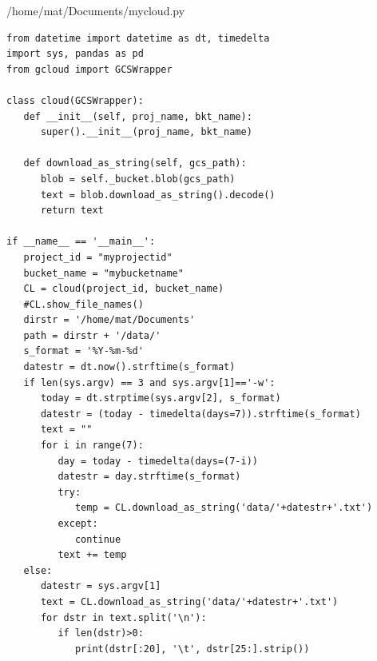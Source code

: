 \documentclass[12pt,a4j]{jsbook}
\begin{document}
\begin{spacing}{0.87}
\begin{itembox}[l]{/home/mat/Documents/mycloud.py}
\begin{verbatim}
from datetime import datetime as dt, timedelta
import sys, pandas as pd
from gcloud import GCSWrapper

class cloud(GCSWrapper):
   def __init__(self, proj_name, bkt_name):
      super().__init__(proj_name, bkt_name)

   def download_as_string(self, gcs_path):
      blob = self._bucket.blob(gcs_path)
      text = blob.download_as_string().decode()
      return text

if __name__ == '__main__':
   project_id = "myprojectid"
   bucket_name = "mybucketname"
   CL = cloud(project_id, bucket_name)
   #CL.show_file_names()
   dirstr = '/home/mat/Documents'
   path = dirstr + '/data/'
   s_format = '%Y-%m-%d'
   datestr = dt.now().strftime(s_format)
   if len(sys.argv) == 3 and sys.argv[1]=='-w':
      today = dt.strptime(sys.argv[2], s_format)
      datestr = (today - timedelta(days=7)).strftime(s_format)
      text = ""
      for i in range(7):
         day = today - timedelta(days=(7-i))
         datestr = day.strftime(s_format)
         try:
            temp = CL.download_as_string('data/'+datestr+'.txt')
         except:
            continue
         text += temp
   else:
      datestr = sys.argv[1]
      text = CL.download_as_string('data/'+datestr+'.txt')
      for dstr in text.split('\n'):
         if len(dstr)>0:
            print(dstr[:20], '\t', dstr[25:].strip())
\end{verbatim}
\end{itembox}
\end{spacing}
\end{document}
